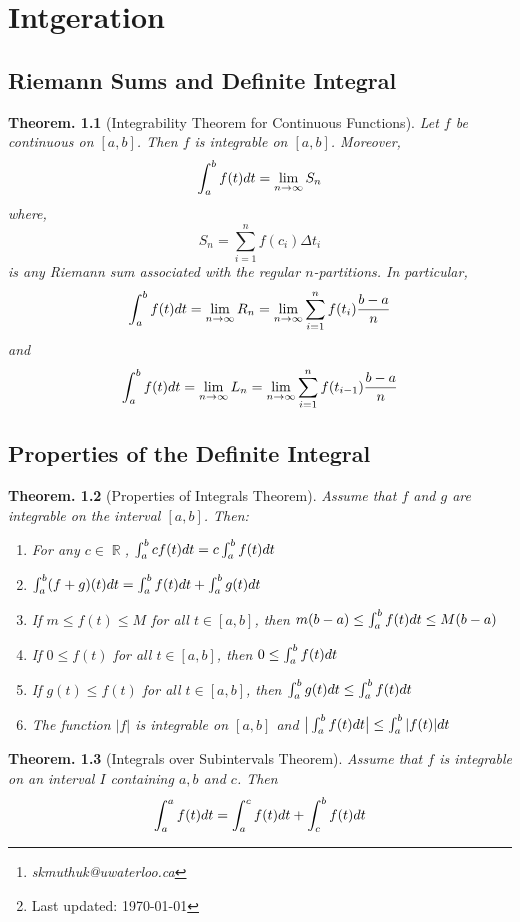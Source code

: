 \documentclass[11pt, a4paper]{memoir}
\title{\subject}
\author{Sachin Kumar\thanks{\itshape skmuthuk@uwaterloo.ca}\\ University of Waterloo}
\date{\semester\thanks{Last updated: \today}}
\DeclareMathOperator{\R}{{\mathbb{R}}}
\theoremstyle{change}
\newtheorem{theorem}{Theorem.}[section]
\theoremstyle{plain}
\theoremstyle{nonumberplain}
\numberwithin{equation}{section}
\begin{document}
\hypersetup{pageanchor=false}
\maketitle
\newpage
\frontmatter
\hypersetup{pageanchor=true}
\tableofcontents*
\newpage
\mainmatter







\chapter{Intgeration}
\section{Riemann Sums and Definite Integral}
\begin{theorem}[Integrability Theorem for Continuous Functions]
Let $f$ be continuous on $[a, b]$. Then $f$ is integrable on $[a,b]$. Moreover, 
$$\int^b_a f(t) \space dt = \lim_{n \to \infty}S_n$$ where, $$S_n = \sum^n_{i = 1}f(c_i) \Delta t_i$$ is any Riemann sum associated with the regular $n$-partitions. In particular, $$\int^b_a f(t) \space dt=\lim_{n \to \infty} R_n = \lim_{n \to \infty} \sum^n_{i = 1} f(t_i)\dfrac{b-a}{n}$$ and $$\int^b_a f(t) \space dt=\lim_{n \to \infty} L_n = \lim_{n \to \infty} \sum^n_{i = 1} f(t_{i - 1}) \dfrac{b-a}{n}$$
\end{theorem}
\section{Properties of the Definite Integral}
\begin{theorem}[Properties of Integrals Theorem]
Assume that $f$ and $g$ are integrable on the interval $[a, b]$. Then:
\begin{enumerate}
    \item For any $c \in \R$, $\int^b_a c \space f(t) \space dt = c \int^b_a f(t) \space dt$
    \item $\int^b_a (f + g)(t) \space dt = \int^b_a f(t) \space dt + \int^b_a g(t) \space dt$
    \item If $m \le f(t) \le M$ for all $t \in [a, b]$, then $m(b-a) \le \int^b_a f(t) \space dt \le M(b-a)$
    \item If $0 \le f(t)$ for all $t \in [a, b]$, then $0 \le \int^b_a f(t) \space dt$
    \item If $g(t) \le f(t)$ for all $t \in [a, b]$, then $\int^b_a g(t) \space dt \le \int^b_a f(t) \space dt$
    \item The function $|f|$ is integrable on $[a,b]$ and $\big|\int^b_a f(t) \space dt \big| \le \int^b_a |f(t)| \space dt$
\end{enumerate}
\end{theorem}
\begin{theorem}[Integrals over Subintervals Theorem]
    Assume that $f$ is integrable on an interval $I$ containing $a, b$ and $c$. Then $$\int^a_a f(t) \space dt = \int^c_a f(t) \space dt + \int^b_c f(t) \space dt$$
\end{theorem}
\end{document}
